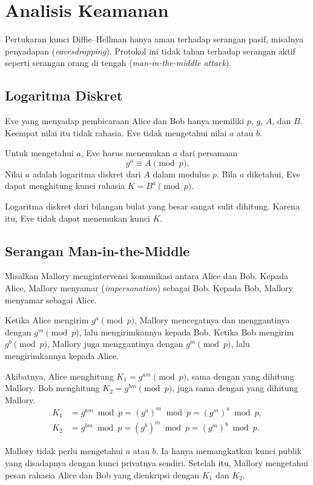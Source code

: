 \section{Analisis Keamanan}
\label{sec:keamanan-dh}


Pertukaran kunci Diffie--Hellman hanya aman terhadap serangan pasif, misalnya
penyadapan (\textit{eavesdropping}). Protokol ini tidak tahan terhadap serangan
aktif seperti serangan orang di tengah
(\textit{man-in-the-middle attack}).

\subsection{Logaritma Diskret}
\label{subsec:dlog-dh}

Eve yang menyadap pembicaraan Alice dan Bob hanya memiliki $p$, $g$, $A$, dan
$B$. Keempat nilai itu tidak rahasia. Eve tidak mengetahui nilai $a$ atau $b$.

Untuk mengetahui $a$, Eve harus menemukan $a$ dari persamaan
\begin{equation}
g^a \equiv A \pmod p .
\label{eq:dlp}
\end{equation}
Nilai $a$ adalah logaritma diskret dari $A$ dalam modulus $p$. Bila $a$
diketahui, Eve dapat menghitung kunci rahasia $K = B^a \pmod p$.

Logaritma diskret dari bilangan bulat yang besar sangat sulit dihitung.
Karena itu, Eve tidak dapat menemukan kunci $K$.

\subsection{Serangan Man-in-the-Middle}
\label{subsec:mitm-dh}

Misalkan Mallory mengintervensi komunikasi antara Alice dan Bob. Kepada Alice,
Mallory menyamar (\textit{impersonation}) sebagai Bob. Kepada Bob, Mallory
menyamar sebagai Alice.

Ketika Alice mengirim $g^a \pmod p$, Mallory mencegatnya dan menggantinya dengan
$g^m \pmod p$, lalu mengirimkannya kepada Bob. Ketika Bob mengirim
$g^b \pmod p$, Mallory juga menggantinya dengan $g^m \pmod p$, lalu
mengirimkannya kepada Alice.

Akibatnya, Alice menghitung $K_1 = g^{am} \pmod p$, sama dengan yang dihitung
Mallory. Bob menghitung $K_2 = g^{bm} \pmod p$, juga sama dengan yang dihitung
Mallory.
\begin{align}
K_1 &= g^{am} \bmod p = (g^a)^m \bmod p = (g^m)^a \bmod p ,
        \label{eq:mitm-k1} \\
K_2 &= g^{bm} \bmod p = (g^b)^m \bmod p = (g^m)^b \bmod p .
        \label{eq:mitm-k2}
\end{align}

Mallory tidak perlu mengetahui $a$ atau $b$. Ia hanya memangkatkan kunci publik
yang disadapnya dengan kunci privatnya sendiri. Setelah itu, Mallory mengetahui
pesan rahasia Alice dan Bob yang dienkripsi dengan $K_1$ dan $K_2$.


